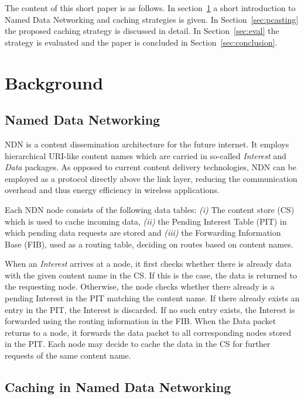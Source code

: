 \documentclass[conference]{IEEEtran}
\begin{document}
The content of this short paper is as follows. In section~\ref{sec:background} a short introduction to Named Data Networking and caching strategies is given. In Section~\ref{sec:pcasting} the proposed caching strategy is discussed in detail. In Section~\ref{sec:eval} the strategy is evaluated and the paper is concluded in Section~\ref{sec:conclusion}.

\section{Background}
\label{sec:background}

\subsection{Named Data Networking}

NDN is a content dissemination architecture for the future internet. It employs hierarchical URI-like content names which are carried in so-called \textit{Interest} and \textit{Data} packages. As opposed to current content delivery technologies, NDN can be employed as a protocol directly above the link layer\cite{Baccelli2014}, reducing the communication overhead and thus energy efficiency in wireless applications.

Each NDN node consists of the following data tables:
    \textit{(i)} The content store (CS) which is used to cache incoming data,
    \textit{(ii)} the Pending Interest Table (PIT) in which pending data requests are stored and
    \textit{(iii)} the Forwarding Information Base (FIB), used as a routing table, deciding on routes based on content names.

When an \textit{Interest} arrives at a node, it first checks whether there is already data with the given content name in the CS. If this is the case, the data is returned to the requesting node. Otherwise, the node checks whether there already is a pending Interest in the PIT matching the content name. If there already exists an entry in the PIT, the Interest is discarded. If no such entry exists, the Interest is forwarded using the routing information in the FIB. When the Data packet returns to a node, it forwards the data packet to all corresponding nodes stored in the PIT. Each node may decide to cache the data in the CS for further requests of the same content name.

\subsection{Caching in Named Data Networking}
\end{document}

